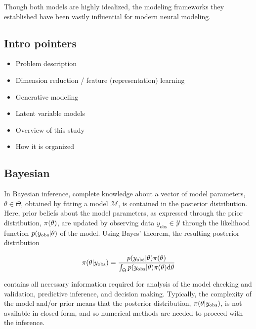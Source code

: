 Though both models are highly idealized, the modeling frameworks they established have been vastly influential for modern neural modeling.

\subsection{Intro pointers}

\begin{itemize}
    \item Problem description
    \item Dimension reduction / feature (representation) learning
    \item Generative modeling
    \item Latent variable models
    \item Overview of this study
    \item How it is organized
\end{itemize}

\subsection{Bayesian}

In Bayesian inference, complete knowledge about a vector of model parameters, $\theta \in \Theta$, obtained by fitting a model $\mathcal{M}$, is contained in the posterior distribution. Here, prior beliefs about the model parameters, as expressed through the prior distribution, $\pi \qty(\theta)$, are updated by observing data $y_\mathrm{obs} \in \mathcal{Y}$ through the likelihood function $p  \qty(y_\mathrm{obs} | \theta)$ of the model. Using Bayes' theorem, the resulting posterior distribution

\begin{equation}
    \pi \qty(\theta | y_\mathrm{obs}) = \frac{p  \qty(y_\mathrm{obs} | \theta) \pi \qty(\theta)}{\int_\Theta p  \qty(y_\mathrm{obs} | \theta) \pi \qty(\theta) \mathrm{d} \theta}
\end{equation}

contains all necessary information required for analysis of the model checking and validation, predictive inference, and decision making. Typically, the complexity of the model and/or prior means that the posterior distribution, $\pi \qty(\theta | y_\mathrm{obs})$, is not available in closed form, and so numerical methods are needed to proceed with the inference. 

